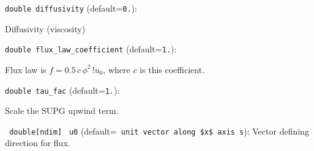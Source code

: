 \item\verb+double diffusivity+ {\rm(default=\verb|0.|)}:

Diffusivity (viscosity)

\item\verb+double flux_law_coefficient+ {\rm(default=\verb|1.|)}:

Flux law is $f= 0.5\,c\, \phi^2\,!u_0$, where $c$
is this coefficient. 

\item\verb+double tau_fac+ {\rm(default=\verb|1.|)}:

Scale the SUPG upwind term. 

\item\verb+ double[ndim]+ \verb+ u0+ {\rm(default=\verb| unit vector along $x$ axis s|)}:
 Vector defining direction for flux. 
